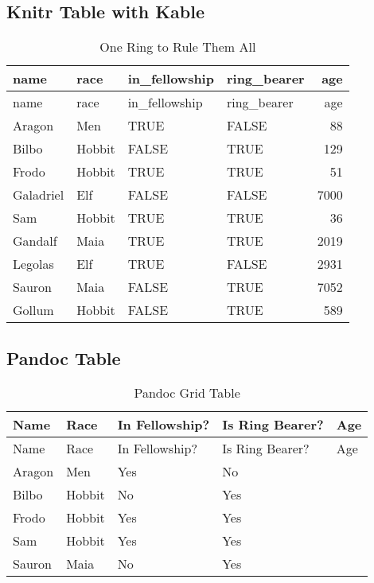 \documentclass[
]{article}
\begin{document}
\hypertarget{knitr-table-with-kable}{%
\subsection{Knitr Table with Kable}\label{knitr-table-with-kable}}

\begin{longtable}[]{@{}llllr@{}}
\caption{One Ring to Rule Them All}\tabularnewline
\toprule
name & race & in\_fellowship & ring\_bearer & age \\
\midrule
\endfirsthead
\toprule
name & race & in\_fellowship & ring\_bearer & age \\
\midrule
\endhead
Aragon & Men & TRUE & FALSE & 88 \\
Bilbo & Hobbit & FALSE & TRUE & 129 \\
Frodo & Hobbit & TRUE & TRUE & 51 \\
Galadriel & Elf & FALSE & FALSE & 7000 \\
Sam & Hobbit & TRUE & TRUE & 36 \\
Gandalf & Maia & TRUE & TRUE & 2019 \\
Legolas & Elf & TRUE & FALSE & 2931 \\
Sauron & Maia & FALSE & TRUE & 7052 \\
Gollum & Hobbit & FALSE & TRUE & 589 \\
\bottomrule
\end{longtable}

\hypertarget{pandoc-table}{%
\subsection{Pandoc Table}\label{pandoc-table}}

\begin{longtable}[]{@{}
  >{\centering\arraybackslash}p{}
  >{\centering\arraybackslash}p{}
  >{\raggedright\arraybackslash}p{}
  >{\raggedright\arraybackslash}p{}
  >{\raggedleft\arraybackslash}p{}@{}}
\caption{Pandoc Grid Table}\tabularnewline
\toprule
Name & Race & In Fellowship? & Is Ring Bearer? & Age \\
\midrule
\endfirsthead
\toprule
Name & Race & In Fellowship? & Is Ring Bearer? & Age \\
\midrule
\endhead
Aragon & Men & Yes & No & 88 \\
Bilbo & Hobbit & No & Yes & 129 \\
Frodo & Hobbit & Yes & Yes & 51 \\
Sam & Hobbit & Yes & Yes & 36 \\
Sauron & Maia & No & Yes & 7052 \\
\bottomrule
\end{longtable}
\end{document}
